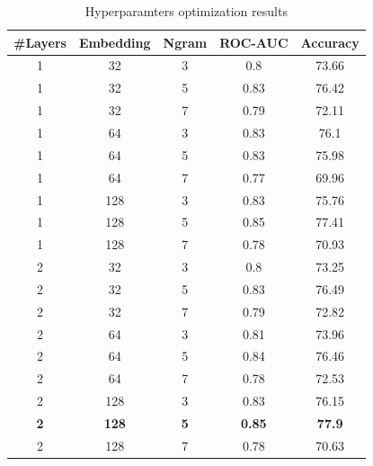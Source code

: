 \begin{table}[!htbp]
	\centering
	\begin{tabular}{||c c c c c||} 
		\#Layers & Embedding & Ngram & ROC-AUC & Accuracy \\ [0.5ex] 
		\hline\hline
		1      & 32                      & 3     & 0.8     & 73.66    \\
		1      & 32                      & 5     & 0.83    & 76.42    \\
		1      & 32                      & 7     & 0.79    & 72.11    \\
		1      & 64                      & 3     & 0.83    & 76.1     \\
		1      & 64                      & 5     & 0.83    & 75.98    \\
		1      & 64                      & 7     & 0.77    & 69.96    \\
		1      & 128                     & 3     & 0.83    & 75.76    \\
		1      & 128                     & 5     & 0.85    & 77.41    \\
		1      & 128                     & 7     & 0.78    & 70.93    \\
		2      & 32                      & 3     & 0.8     & 73.25    \\
		2      & 32                      & 5     & 0.83    & 76.49    \\
		2      & 32                      & 7     & 0.79    & 72.82    \\
		2      & 64                      & 3     & 0.81    & 73.96    \\
		2      & 64                      & 5     & 0.84    & 76.46    \\
		2      & 64                      & 7     & 0.78    & 72.53    \\
		2      & 128                     & 3     & 0.83    & 76.15    \\
		\textbf{2} & \textbf{128}            & \textbf{5} & \textbf{0.85} & \textbf{77.9} \\
		2      & 128                     & 7     & 0.78    & 70.63    \\[1ex]
	\end{tabular}
	\caption{Hyperparamters optimization results}
	\label{table:hyper_results}
\end{table}


